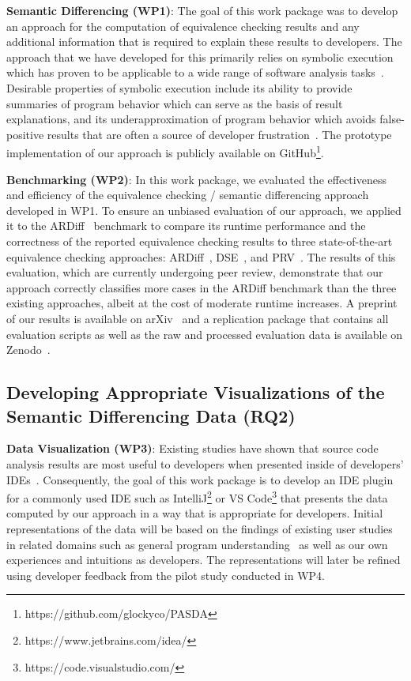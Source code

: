 \textbf{Semantic Differencing (WP1)}:
%
The goal of this work package was to develop an approach for the computation of equivalence checking results and any additional information that is required to explain these results to developers.
%
The approach that we have developed for this primarily relies on symbolic execution~\cite{king_1976_symbolic} which has proven to be applicable to a wide range of software analysis tasks~\cite{baldoni_2018_survey}.
%
Desirable properties of symbolic execution include its ability to provide summaries of program behavior which can serve as the basis of result explanations, and its underapproximation of program behavior which avoids false-positive results that are often a source of developer frustration~\cite{parnin_2011_debugging_help,person_2008_dse}. 
%
The prototype implementation of our approach is publicly available on GitHub\footnote{https://github.com/glockyco/PASDA}.

\textbf{Benchmarking (WP2)}: 
%
In this work package, we evaluated the effectiveness and efficiency of the equivalence checking / semantic differencing approach developed in WP1.
%
To ensure an unbiased evaluation of our approach, we applied it to the ARDiff~\cite{badihi_2020_ardiff} benchmark to compare its runtime performance and the correctness of the reported equivalence checking results to three state-of-the-art equivalence checking approaches: ARDiff~\cite{badihi_2020_ardiff}, DSE~\cite{person_2008_dse}, and PRV~\cite{boehme_2013_prv}.
%
The results of this evaluation, which are currently undergoing peer review, demonstrate that our approach correctly classifies more cases in the ARDiff benchmark than the three existing approaches, albeit at the cost of moderate runtime increases.
%
A preprint of our results is available on arXiv~\cite{glock_2023_pasda_preprint} and a replication package that contains all evaluation scripts as well as the raw and processed evaluation data is available on Zenodo~\cite{glock_2023_replicationpackage}.

\subsection{Developing Appropriate Visualizations of the Semantic Differencing Data (RQ2)}

\textbf{Data Visualization (WP3)}: 
%
Existing studies have shown that source code analysis results are most useful to developers when presented inside of developers' IDEs~\cite{alaboudi_2021_edit,layman_2013_debugging}.
%
Consequently, the goal of this work package is to develop an IDE plugin for a commonly used IDE such as IntelliJ\footnote{https://www.jetbrains.com/idea/} or VS Code\footnote{https://code.visualstudio.com/} that presents the data computed by our approach in a way that is appropriate for developers.
%
Initial representations of the data will be based on the findings of existing user studies in related domains such as general program understanding~\cite{hoffswell_2018_augmenting,sulir_2018_visual_augmentation} as well as our own experiences and intuitions as developers.
%
The representations will later be refined using developer feedback from the pilot study conducted in WP4.

